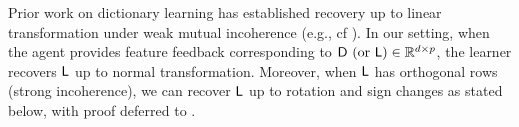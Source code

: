 Prior work on dictionary learning has established recovery up to linear transformation under weak mutual incoherence (e.g., cf \cite{gribonval_rotation}). In our setting, when the agent provides feature feedback corresponding to $\dd \text{ (or $\sf{L}$)} \in \reals^{d \times p}$, the learner recovers $\sf{L}$ up to normal transformation. Moreover, when $\sf{L}$ has orthogonal rows (strong incoherence), we can recover $\sf{L}$ up to rotation and sign changes as stated below, with proof deferred to .


